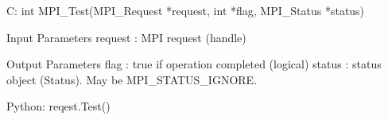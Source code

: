 C:
int MPI_Test(MPI_Request *request, int *flag, MPI_Status *status)

Input Parameters
request : MPI request (handle)

Output Parameters
flag : true if operation completed (logical)
status : status object (Status). May be MPI_STATUS_IGNORE.

Python:
reqest.Test()
